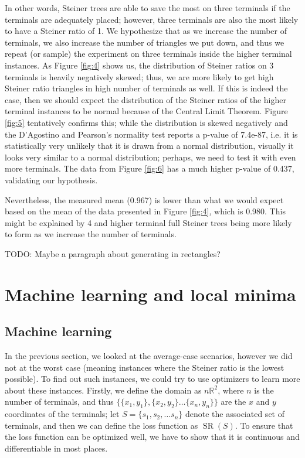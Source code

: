 \documentclass{mpaper}
\begin{document}
In other words, Steiner trees are able to save the most on three terminals if the terminals are adequately placed; however, three terminals are also the most likely to have a Steiner ratio of 1. We hypothesize that as we increase the number of terminals, we also increase the number of triangles we put down, and thus we repeat (or sample) the experiment on three terminals inside the higher terminal instances. As Figure \ref{fig:4} shows us, the distribution of Steiner ratios on 3 terminals is heavily negatively skewed; thus, we are more likely to get high Steiner ratio triangles in high number of terminals as well. If this is indeed the case, then we should expect the distribution of the Steiner ratios of the higher terminal instances to be normal because of the Central Limit Theorem. Figure \ref{fig:5} tentatively confirms this; while the distribution is skewed negatively and the D'Agostino and Pearson's normality test reports a p-value of 7.4e-87, i.e. it is statistically very unlikely that it is drawn from a normal distribution, visually it looks very similar to a normal distribution; perhaps, we need to test it with even more terminals. The data from Figure \ref{fig:6} has a much higher p-value of 0.437, validating our hypothesis.

Nevertheless, the measured mean (0.967) is lower than what we would expect based on the mean of the data presented in Figure \ref{fig:4}, which is 0.980. This might be explained by 4 and higher terminal full Steiner trees being more likely to form as we increase the number of terminals. 

TODO: Maybe a paragraph about generating in rectangles?

\section{Machine learning and local minima}\label{sec:mla}
\subsection{Machine learning}\label{sec:ml}

In the previous section, we looked at the average-case scenarios, however we did not at the worst case (meaning instances where the Steiner ratio is the lowest possible). To find out such instances, we could try to use optimizers to learn more about these instances. Firstly, we define the domain as $n\mathbb{R}^{2}$, where $n$ is the number of terminals, and thus $\{\{x_1, y_1\}, \{x_2, y_2\} \dots \{x_n, y_n\}\}$ are the $x$ and $y$ coordinates of the terminals; let $S=\{s_1, s_2, \dots s_n\}$ denote the associated set of terminals, and then we can define the loss function as $\operatorname{SR}(S)$. To ensure that the loss function can be optimized well, we have to show that it is continuous and differentiable in most places.
\end{document}
